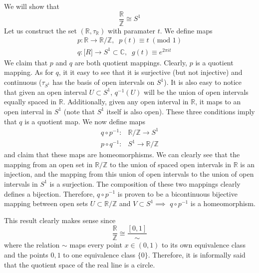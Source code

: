     \begin{example}
      We will show that
      \begin{equation}
        \frac{\mathbb{R}}{\mathbb{Z}} \cong S^1
      \end{equation}
      Let us construct the set $(\mathbb{R}, \tau_{\mathbb{R}})$ with paramater $t$. We define maps
      \begin{align*}
        p: \mathbb{R} \rightarrow \mathbb{R} / \mathbb{Z}, \;\; p(t) \equiv t \; (\text{mod } 1) \\
        q: \mathbb[R] \rightarrow S^1 \subset \mathbb{C}, \;\; g(t) \equiv e^{2 \pi i t} 
      \end{align*}
      We claim that $p$ and $q$ are both quotient mappings. Clearly, $p$ is a quotient mapping. As for $q$, it it easy to see that it is surjective (but not injective) and continuous ($\tau_{S^1}$ has the basis of open intervals on $S^1$). It is also easy to notice that given an open interval $U \subset S^1$, $q^{-1}(U)$ will be the union of open intervals equally spaced in $\mathbb{R}$. Additionally, given any open interval in $\mathbb{R}$, it maps to an open interval in $S^1$ (note that $S^1$ itself is also open). These three conditions imply that $q$ is a quotient map. We now define maps 
      \begin{align}
        q \circ p^{-1}: & \mathbb{R} / \mathbb{Z} \rightarrow S^1 \\
        p \circ q^{-1}: & S^1 \rightarrow \mathbb{R} / \mathbb{Z}
      \end{align}
      and claim that these maps are homeomorphisms. We can clearly see that the mapping from an open set in $\mathbb{R} / \mathbb{Z}$ to the union of spaced open intervals in $\mathbb{R}$ is an injection, and the mapping from this union of open intervals to the union of open intervals in $S^1$ is a surjection. The composition of these two mappings clearly defines a bijection. Therefore, $q \circ p^{-1}$ is proven to be a bicontinuous bijective mapping between open sets $U \subset \mathbb{R} / \mathbb{Z}$ and $V \subset S^1 \implies$ $q \circ p^{-1}$ is a homeomorphism. 

      This result clearly makes sense since 
      \begin{equation}
        \frac{\mathbb{R}}{\mathbb{Z}} \cong \frac{[0,1]}{\sim}
      \end{equation}
      where the relation $\sim$ maps every point $x \in (0,1)$ to its own equivalence class and the points $0, 1$ to one equivalence class $\{0\}$. Therefore, it is informally said that the quotient space of the real line is a circle. 


\end{example}
